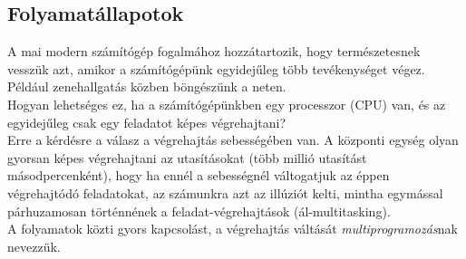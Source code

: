 \documentclass[tikz,12pt,margin=0px]{article}
\begin{document}
    \subsection*{Folyamatállapotok}

    \noindent A mai modern számítógép fogalmához hozzátartozik, hogy természetesnek vesszük azt, amikor a számítógépünk egyidejűleg több tevékenységet végez. Például zenehallgatás közben böngészünk a neten.\\

    \noindent Hogyan lehetséges ez, ha a számítógépünkben egy processzor (CPU) van, és az egyidejűleg csak egy feladatot képes végrehajtani?\\

    \noindent Erre a kérdésre a válasz a végrehajtás sebességében van. A központi egység olyan gyorsan képes végrehajtani az utasításokat (több millió utasítást másodpercenként), hogy ha ennél a sebességnél váltogatjuk az éppen végrehajtódó feladatokat, az számunkra azt az illúziót kelti, mintha egymással párhuzamosan történnének a feladat-végrehajtások (ál-multitasking).\\

    \noindent A folyamatok közti gyors kapcsolást, a végrehajtás váltását \emph{multiprogramozás}nak nevezzük.\\
\end{document}
